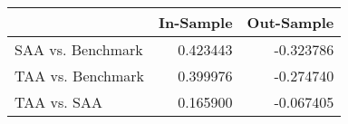 \begin{tabular}{lrr}
\toprule
{} &  In-Sample &  Out-Sample \\
\midrule
SAA vs. Benchmark &   0.423443 &   -0.323786 \\
TAA vs. Benchmark &   0.399976 &   -0.274740 \\
TAA vs. SAA       &   0.165900 &   -0.067405 \\
\bottomrule
\end{tabular}
